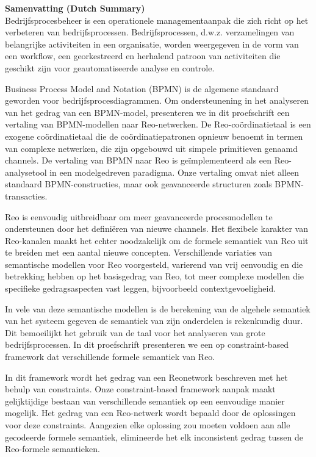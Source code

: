 {\textbf{\Large{Samenvatting (Dutch Summary)}}}
\vspace*{1cm}
\\

Bedrijfsprocesbeheer is een operationele managementaanpak die zich richt op het verbeteren van bedrijfsprocessen. Bedrijfsprocessen, d.w.z. verzamelingen van belangrijke activiteiten in een organisatie, worden weergegeven in de vorm van een workflow, een georkestreerd en herhalend patroon van activiteiten die geschikt zijn voor geautomatiseerde analyse en controle. 

Business Process Model and Notation (BPMN) is de algemene standaard geworden voor bedrijfsprocesdiagrammen. 
Om ondersteunening in het analyseren van het gedrag van een BPMN-model,
presenteren we in dit proefschrift een vertaling van BPMN-modellen naar Reo-netwerken. De Reo-coördinatietaal is een exogene coördinatietaal die de coördinatiepatronen opnieuw benoemt in termen van complexe netwerken, die zijn opgebouwd uit simpele primitieven genaamd channels. De vertaling van BPMN naar Reo is geïmplementeerd als een Reo-analysetool in een modelgedreven paradigma. Onze vertaling omvat niet alleen standaard BPMN-constructies, maar ook geavanceerde structuren zoals BPMN-transacties. 

Reo is eenvoudig uitbreidbaar om meer geavanceerde procesmodellen te ondersteunen door het definiëren van nieuwe channels. Het flexibele karakter van Reo-kanalen maakt het echter noodzakelijk om de formele semantiek van Reo uit te breiden met een aantal nieuwe concepten. Verschillende variaties van semantische modellen voor Reo voorgesteld, varierend van vrij eenvoudig en die betrekking hebben op het basisgedrag van Reo, tot meer complexe modellen die specifieke gedragsaspecten vast leggen, bijvoorbeeld contextgevoeligheid. 

In vele van deze semantische modellen is de berekening van de algehele semantiek van het systeem gegeven de semantiek van zijn onderdelen is rekenkundig duur. Dit bemoeilijkt het gebruik van de taal voor het analyseren van grote bedrijfsprocessen. In dit proefschrift presenteren we een op constraint-based framework dat verschillende formele semantiek van Reo. 

In dit framework wordt het gedrag van een Reonetwork beschreven met het behulp van constraints. Onze constraint-based framework aanpak maakt gelijktijdige bestaan van verschillende semantiek op een eenvoudige manier mogelijk. Het gedrag van een Reo-netwerk wordt bepaald door de oplossingen voor deze constraints. Aangezien elke oplossing zou moeten voldoen aan alle gecodeerde formele semantiek, elimineerde het elk inconsistent gedrag tussen de Reo-formele semantieken. 

